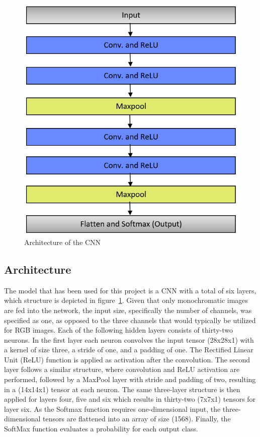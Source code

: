 \documentclass[@CLASSOPTIONS@]{tumarticle}
\begin{document}
\begin{figure}
    \begin{minipage}{0.48\textwidth}
     \centering
     \includegraphics[width=.9\linewidth]{figures/CNN_Arch_5}
     \caption{Architecture of the CNN}\label{Fig:CNN_A}
   \end{minipage}
\end{figure}

\subsection{Architecture}

The model that has been used for this project is a CNN with a total of six layers, which structure is depicted in
figure~\ref{Fig:CNN_A}.
Given that only monochromatic images are fed into the network, the input size, specifically the number of channels,
was specified as one, as opposed to the three channels that would typically be utilized for RGB images.
Each of the following hidden layers consists of thirty-two neurons.
In the first layer each neuron convolves the input tensor (28x28x1) with a kernel of size three, a stride of one, and
a padding of one.
The Rectified Linear Unit (ReLU) function is applied as activation after the convolution.
The second layer follows a similar structure, where convolution and ReLU activation are performed, followed by a MaxPool
layer with stride and padding of two, resulting in a (14x14x1) tensor at each neuron.
The same three-layer structure is then applied for layers four, five and six which results in thirty-two (7x7x1) tensors for
layer six.
As the Softmax function requires one-dimensional input, the three-dimensional tensors are flattened into an array of size (1568).
Finally, the SoftMax function evaluates a probability for each output class.
\end{document}
